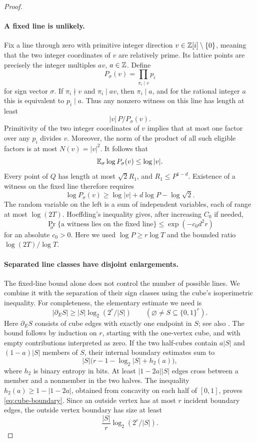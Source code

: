 \begin{proof}
\paragraph{A fixed line is unlikely.}
Fix a line through zero with primitive integer direction
\(v\in\mathbb Z[i]\setminus\{0\}\), meaning that the two integer
coordinates of \(v\) are relatively prime.
Its lattice points are precisely the integer multiples \(a v\),
\(a\in\mathbb Z\). Define
\[
 P_\sigma(v)=\prod_{\pi_i\mid v}p_i
\]
for sign vector \(\sigma\). If \(\pi_i\nmid v\) and
\(\pi_i\mid a v\), then \(\pi_i\mid a\), and for the rational integer
\(a\) this is equivalent to \(p_i\mid a\).
Thus any nonzero witness on this line has length at least
\[
 |v|\,P/P_\sigma(v).
\]
Primitivity of the two integer coordinates of \(v\) implies that at most
one factor over any \(p_i\) divides \(v\). Moreover, the norm of the
product of all such eligible factors is at most \(N(v)=|v|^2\).
It follows that
\[
 \mathbb E_\sigma\log P_\sigma(v)\le\log|v|.
\]
Every point of \(Q\) has length at most \(\sqrt2R_1\), and
\(R_1\le P^{1-d}\). Existence of a witness on the fixed line therefore
requires
\[
 \log P_\sigma(v)\ge\log|v|+d\log P-\log\sqrt2.
\]
The random variable on the left is a sum of independent variables,
each of range at most \(\log(2T)\). Hoeffding's inequality
\cite[Theorem 2, Eq.~(2.6)]{Hoeffding} gives, after increasing \(C_0\) if needed,
\begin{equation}\label{eq:line-tail}
 \Pr_\sigma\{\text{a witness lies on the fixed line}\}
 \le \exp(-c_0d^2r)
\end{equation}
for an absolute \(c_0>0\). Here we used
\(\log P\ge r\log T\) and the bounded ratio
\(\log(2T)/\log T\).

\paragraph{Separated line classes have disjoint enlargements.}
The fixed-line bound alone does not control the number of possible lines.
We combine it with the separation of their sign classes using the cube's
isoperimetric inequality. For completeness, the
elementary estimate we need is
\begin{equation}\label{eq:cube-boundary}
 |\partial_E S|\ge |S|\log_2(2^r/|S|)
 \qquad(\varnothing\ne S\subseteq\{0,1\}^r).
\end{equation}
Here \(\partial_E S\) consists of cube edges with exactly one endpoint
in \(S\); see also \cite{Harper}.
The bound follows by induction on \(r\), starting with the one-vertex
cube, and with empty contributions interpreted as zero. If the two half-cubes contain
\(a|S|\) and \((1-a)|S|\) members of \(S\), their internal boundary
estimates sum to
\[
 |S|\bigl(r-1-\log_2|S|+h_2(a)\bigr),
\]
where \(h_2\) is binary entropy in bits. At least
\(|1-2a||S|\) edges cross between a member and a nonmember in the two
halves. The inequality
\(h_2(a)\ge1-|1-2a|\), obtained from concavity on each half of
\([0,1]\), proves \eqref{eq:cube-boundary}.
Since an outside vertex has at most \(r\) incident boundary edges,
the outside vertex boundary has size at least
\[
 \frac{|S|}{r}\log_2(2^r/|S|).
\]


\end{proof}
